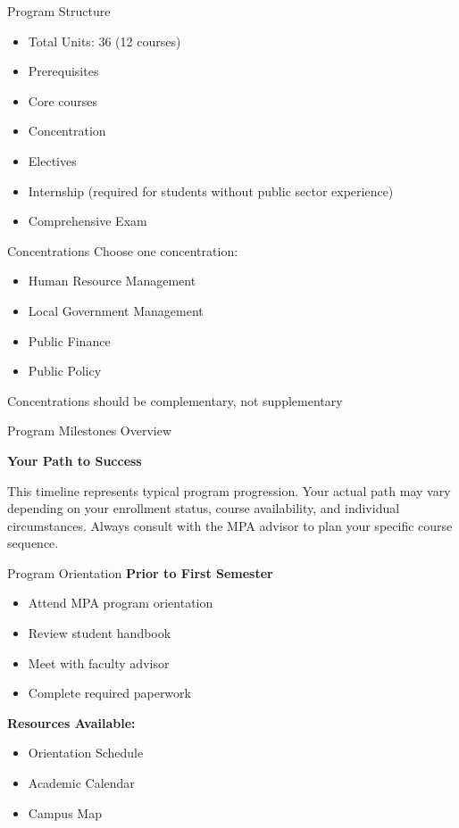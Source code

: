 \documentclass[10pt]{beamer}
\begin{document}
\begin{frame}{Program Structure}
\begin{itemize}
\item Total Units: 36 (12 courses)
\item Prerequisites
\item Core courses
\item Concentration
\item Electives
\item Internship (required for students without public sector experience)
\item Comprehensive Exam
\end{itemize}
\end{frame}

\begin{frame}{Concentrations}
Choose one concentration:
\begin{itemize}
\item Human Resource Management
\item Local Government Management
\item Public Finance
\item Public Policy
\end{itemize}
Concentrations should be complementary, not supplementary
\end{frame}


\begin{frame}{Program Milestones Overview}
    \begin{center}
    \textbf{Your Path to Success}
    \end{center}
    \small{This timeline represents typical program progression. Your actual path may vary depending on your enrollment status, course availability, and individual circumstances. Always consult with the MPA advisor to plan your specific course sequence.}
    \end{frame}
    
    \begin{frame}{Program Orientation}
    \textbf{Prior to First Semester}
    \begin{itemize}
    \item Attend MPA program orientation
    \item Review student handbook
    \item Meet with faculty advisor
    \item Complete required paperwork
    \end{itemize}
    
    \textbf{Resources Available:}
    \begin{itemize}
    \item Orientation Schedule
    \item Academic Calendar
    \item Campus Map
    \end{itemize}
    \end{frame}
    
\end{document}
